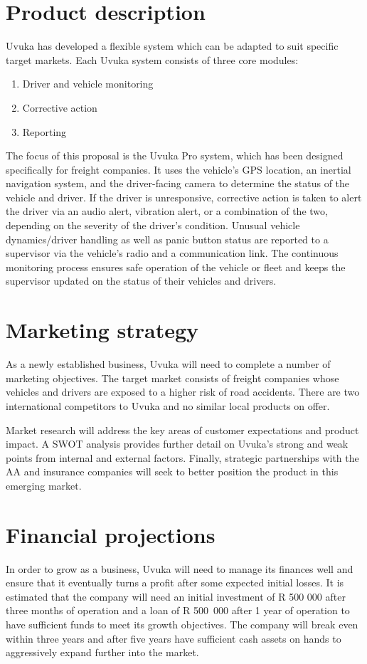 \section*{Product description}
Uvuka has developed a flexible system which can be adapted to suit specific target markets. Each Uvuka system consists of three core modules:
\begin{enumerate}
\item Driver and vehicle monitoring
\item Corrective action
\item Reporting
\end{enumerate}
 

The focus of this proposal is the Uvuka Pro system, which has been designed specifically for freight companies. It uses the vehicle's GPS location, an inertial navigation system, and the driver-facing camera to determine the status of the vehicle and driver. If the driver is unresponsive, corrective action is taken to alert the driver via an audio alert, vibration alert, or a combination of the two, depending on the severity of the driver's condition. Unusual vehicle dynamics/driver handling as well as panic button status are reported to a supervisor via the vehicle’s radio and a communication link. The continuous monitoring process ensures safe operation of the vehicle or fleet and keeps the supervisor updated on the status of their vehicles and drivers.

\section*{Marketing strategy}
As a newly established business, Uvuka will need to complete a number of marketing objectives. The target market consists of freight companies whose vehicles and drivers are exposed to a higher risk of road accidents. There are two international competitors to Uvuka and no similar local products on offer.

Market research will address the key areas of customer expectations and product impact. A SWOT analysis provides further detail on Uvuka's strong and weak points from internal and external factors. Finally, strategic partnerships with the AA and insurance companies will seek to better position the product in this emerging market.

\section*{Financial projections}
In order to grow as a business, Uvuka will need to manage its finances well and ensure that it eventually turns a profit after some expected initial losses. It is estimated that the company will need an initial investment of R 500 000 after three months of operation and a loan of R 500~000 after 1 year of operation to have sufficient funds to meet its growth objectives. The company will break even within three years and after five years have sufficient cash assets on hands to aggressively expand further into the market.

